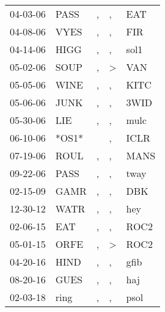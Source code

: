 \begin{supertabular}{lllll}
 04-03-06 &   PASS &  , &             , &   EAT \\
 04-08-06 &   VYES &  , &             , &   FIR \\
 04-14-06 &   HIGG &  , &             , &  sol1 \\
 05-02-06 &   SOUP &  , &  \textgreater &   VAN \\
 05-05-06 &   WINE &  , &             , &  KITC \\
 05-06-06 &   JUNK &  , &             , &  3WID \\
 05-30-06 &    LIE &  , &             , &  mulc \\
 06-10-06 &  *OS1* &    &             , &  ICLR \\
 07-19-06 &   ROUL &  , &             , &  MANS \\
 09-22-06 &   PASS &  , &             , &  tway \\
 02-15-09 &   GAMR &  , &             , &   DBK \\
 12-30-12 &   WATR &  , &             , &   hey \\
 02-06-15 &    EAT &  , &             , &  ROC2 \\
 05-01-15 &   ORFE &  , &  \textgreater &  ROC2 \\
 04-20-16 &   HIND &  , &             , &  gfib \\
 08-20-16 &   GUES &  , &             , &   haj \\
 02-03-18 &   ring &  , &             , &  psol \\
\end{supertabular}
